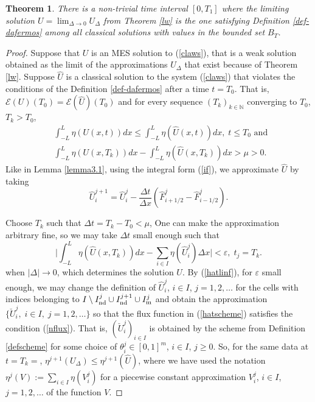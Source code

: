 \documentclass[11pt,a4paper,reqno]{amsart}
\theoremstyle{plain}
\newtheorem{theorem}{Theorem}[section]
\theoremstyle{definition}
\theoremstyle{remark}
\numberwithin{equation}{section}
\begin{document}
{\begin{theorem} \label{t-2}
There is a non-trivial time interval $[0,T_{1}]$ where the limiting solution 
$U=\lim_{\Delta \to 0}U_{\Delta}$ from Theorem \ref{lw} is the one 
satisfying Definition \ref{def-dafermos} among all classical solutions with values 
in the bounded set $B_{T}$.
\end{theorem}

\begin{proof}

Suppose that $U$ is an MES solution to (\ref{claws}), that is
a weak solution obtained as the limit of 
the approximations $U_{\Delta}$ that exist because of Theorem \ref{lw}. 
Suppose $\widehat{U}$ is a classical solution to the system (\ref{claws}) 
that violates the conditions of the Definition \ref{def-dafermos} 
after a time $t=T_{0}$. That is, $\mathcal{E}(U)(T_{0})
=\mathcal{E}(\widehat{U})(T_{0})$ and for every sequence
$(T_{k})_{k\in \mathbb{N}}$  converging to $T_{0}$, $T_{k}>T_{0}$,
\[
\begin{split}
& \int_{-L}^{L} \eta(U(x,t)) dx \leq \int_{-L}^{L} \eta(\widehat{U}(x,t))dx,
\; t\leq T_{0} \text{ and }\\ 
& \int_{-L}^{L} \eta(U(x,T_{k}))dx - \int_{-L}^{L} 
\eta(\widehat{U}(x,T_{k}))dx >\mu>0.
\end{split}
\]
Like in Lemma \ref{lemma3.1}, using the integral form (\ref{if}), we approximate $\hat{U}$ by taking
\begin{equation} \label{hatscheme}
\widehat{U}_{i}^{j+1} = \widehat{U}_{i}^{j} 
-\dfrac{\Delta t}{\Delta x}(\widehat{F}_{i+1/2}^{j}-\widehat{F}_{i-1/2}^{j}).
\end{equation}

Choose $T_{k}$ such that $\Delta t=T_{k}-T_{0}<\mu$, 
One can make the approximation arbitrary fine, so we may take $\Delta t$ small enough 
such that 
$$
\Big| \int_{-L}^{L}\eta(\hat{U}(x,T_{k}))dx-\sum_{i\in I}\eta(\hat{U}_{i}^{j})\Delta x
\Big| < \varepsilon, \; t_{j}=T_{k}.
$$
when $|\Delta|\to 0$, which determines the solution $U$.
By (\ref{hatlinf}), for 
$\varepsilon$ small enough, we may change the definition of $\widehat{U}_{i}^{j}$,
$i\in I$, $j=1,2, \ldots$ for the cells with indices belonging to 
$I \setminus I_{\rm nd}^{j}\cup I_{\rm nd}^{j+1}\cup I_{\rm m}^{j}$ and obtain the approximation
$\{\breve{U}_{i}^{j}, \; i\in I, \; j=1,2, \ldots\}$ so that
the flux function in (\ref{hatscheme}) satisfies the condition (\ref{nflux}).
That is, $(\breve{U}_{i}^{j})_{i\in I}$ is obtained by the scheme from 
Definition \ref{defscheme} for some choice of $\theta_{i}^{j}\in [0,1]^{m}$, 
$i\in I$, $j\geq 0$. So, for the same data at $t=T_{k}=$, 
$\eta^{j+1}(U_{\Delta})\leq \eta^{j+1}(\hat{U})$, where we have used the notation
$\eta^{j}(V):=\sum_{i\in I} \eta(V_{i}^{j})$ for a piecewise constant
approximation $V_{i}^{j}$, $i\in I$, $j=1,2, \ldots$ of the function $V$.


\end{proof}}
\end{document}
